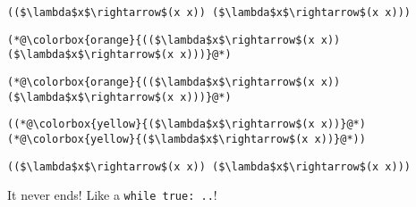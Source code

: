 \documentclass{beamer}
\begin{document}
\begin{frame}[fragile]{\CurrentSection}
\lstset{basicstyle=\ttfamily\small}\lstset{numbers=none}\lstset{language=ML}\begin{lstlisting}
(($\lambda$x$\rightarrow$(x x)) ($\lambda$x$\rightarrow$(x x)))
\end{lstlisting}
\pause\lstset{language=ML}\begin{lstlisting}
(*@\colorbox{orange}{(($\lambda$x$\rightarrow$(x x)) ($\lambda$x$\rightarrow$(x x)))}@*)
\end{lstlisting}

\end{frame}

\begin{frame}[fragile]{\CurrentSection}
\lstset{basicstyle=\ttfamily\small}\lstset{numbers=none}\lstset{language=ML}\begin{lstlisting}
(*@\colorbox{orange}{(($\lambda$x$\rightarrow$(x x)) ($\lambda$x$\rightarrow$(x x)))}@*)
\end{lstlisting}
\pause\lstset{language=ML}\begin{lstlisting}
((*@\colorbox{yellow}{($\lambda$x$\rightarrow$(x x))}@*) (*@\colorbox{yellow}{($\lambda$x$\rightarrow$(x x))}@*))
\end{lstlisting}

\end{frame}

\begin{frame}[fragile]{\CurrentSection}
\lstset{basicstyle=\ttfamily\small}\lstset{numbers=none}\lstset{language=ML}\begin{lstlisting}
(($\lambda$x$\rightarrow$(x x)) ($\lambda$x$\rightarrow$(x x)))
\end{lstlisting}
 
\begin{exampleblock}{}
It never ends! Like a \texttt{while true: ..}!
\end{exampleblock}

 

\end{frame}
\end{document}
